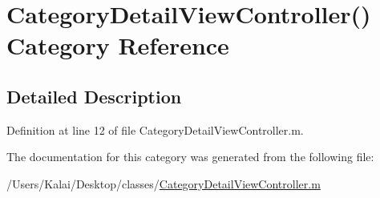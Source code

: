 \hypertarget{category_category_detail_view_controller_07_08}{\section{Category\-Detail\-View\-Controller() Category Reference}
\label{category_category_detail_view_controller_07_08}
}


\subsection{Detailed Description}


Definition at line 12 of file Category\-Detail\-View\-Controller.\-m.



The documentation for this category was generated from the following file\-:\begin{DoxyCompactItemize}
\item 
/\-Users/\-Kalai/\-Desktop/classes/\hyperlink{_category_detail_view_controller_8m}{Category\-Detail\-View\-Controller.\-m}\end{DoxyCompactItemize}
